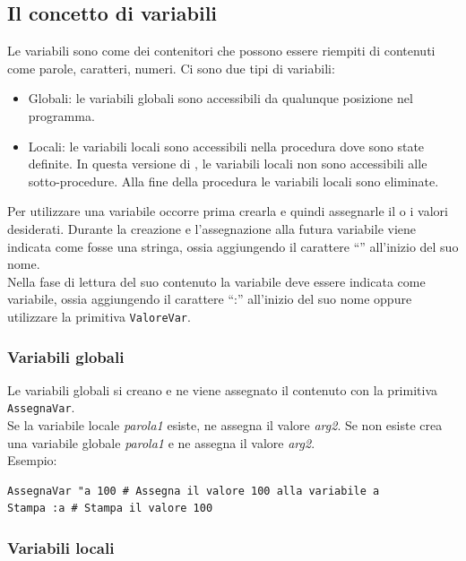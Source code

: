 \subsection{Il concetto di variabili} 
Le variabili sono come dei contenitori che possono essere riempiti di contenuti come parole, caratteri, numeri. Ci sono due tipi di variabili:
\begin{itemize}
	\item Globali: le variabili globali sono accessibili da qualunque posizione nel programma. 
	\item Locali: le variabili locali sono accessibili nella procedura dove sono state definite. In questa versione di \logo, le variabili locali non sono accessibili alle sotto-procedure. Alla fine della procedura le variabili locali sono eliminate.
\end{itemize}

Per utilizzare una variabile occorre prima crearla e quindi assegnarle il o i valori desiderati. Durante la creazione e l'assegnazione alla futura variabile viene indicata come fosse una stringa, ossia aggiungendo il carattere ``\textquotedbl'' all'inizio del suo nome. \\
Nella fase di lettura del suo contenuto la variabile deve essere indicata come variabile, ossia aggiungendo il carattere ``:'' all'inizio del suo nome oppure utilizzare la primitiva \texttt{ValoreVar}.


\subsubsection{Variabili globali} %

Le variabili globali si creano e ne viene assegnato il contenuto con la primitiva \texttt{AssegnaVar}.\\

Se la variabile locale \textit{parola1} esiste, ne assegna il valore \textit{arg2}. Se non esiste crea una variabile globale \textit{parola1} e ne assegna il valore \textit{arg2}.\\
Esempio: 
\begin{lstlisting}[caption="Esempio di creazione ed assegnazione di variabile globale"]
AssegnaVar "a 100 # Assegna il valore 100 alla variabile a
Stampa :a # Stampa il valore 100
\end{lstlisting}

\subsubsection{Variabili locali} %


